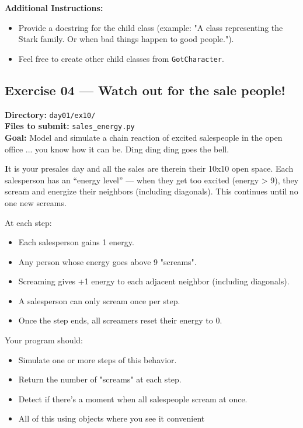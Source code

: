 \documentclass[12pt,a4paper]{article}
\begin{document}
\textbf{Additional Instructions:}
\begin{itemize}
  \item Provide a docstring for the child class (example: "A class representing the Stark family. Or when bad things happen to good people.").
  \item Feel free to create other child classes from \texttt{GotCharacter}.
\end{itemize}

\newpage
\subsection*{Exercise 04 — Watch out for the sale people!}
\textbf{Directory:} \texttt{day01/ex10/}\\
\textbf{Files to submit:} \texttt{sales\_energy.py}\\
\textbf{Goal:} Model and simulate a chain reaction of excited salespeople in the open office ... you know how it can be. Ding ding ding goes the bell.

\textbf It is your presales day and all the sales are therein their 10x10 open space. Each salesperson has an “energy level” — when they get too excited (energy > 9), they scream and energize their neighbors (including diagonals). This continues until no one new screams.

At each step:
\begin{itemize}
  \item Each salesperson gains 1 energy.
  \item Any person whose energy goes above 9 "screams".
  \item Screaming gives +1 energy to each adjacent neighbor (including diagonals).
  \item A salesperson can only scream once per step.
  \item Once the step ends, all screamers reset their energy to 0.
\end{itemize}

Your program should:
\begin{itemize}
  \item Simulate one or more steps of this behavior.
  \item Return the number of "screams" at each step.
  \item Detect if there’s a moment when all salespeople scream at once.
  \item All of this using objects where you see it convenient
\end{itemize}
\end{document}
